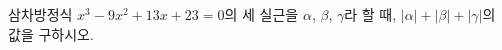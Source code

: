 삼차방정식 $x^3-9x^2+13x+23=0$의 세 실근을 $\alpha$, $\beta$, $\gamma$라 할 때, $|\alpha|+|\beta|+|\gamma|$의 값을 구하시오.
